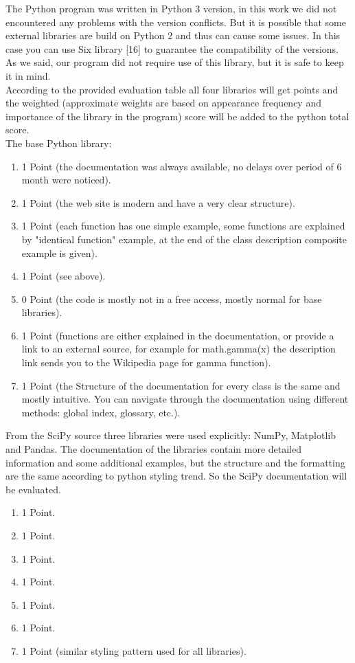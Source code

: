 \documentclass{article}
\begin{document}
The Python program was written in Python 3 version, in this work we did not encountered any problems with the version conflicts. But it is possible that some external libraries are build on Python 2 and thus can cause some issues. In this case you can use Six library [16] to guarantee the compatibility of the versions. As we said, our program did not require use of this library, but it is safe to keep it in mind.\\
According to the provided evaluation table all four libraries will get points and the weighted (approximate weights are based on appearance frequency and importance of the library in the program) score will be added to the python total score.\\
The base Python library:
\begin{enumerate}
    \item 1 Point (the documentation was always available, no delays over period of 6 month were noticed).
    \item 1 Point (the web site is modern and have a very clear structure).
    \item 1 Point (each function has one simple example, some functions are explained by "identical function" example, at the end of the class description composite example is given).
    \item 1 Point (see above).
    \item 0 Point (the code is mostly not in a free access, mostly normal for base libraries).
    \item 1 Point (functions are either explained in the documentation, or provide a link to an external source, for example for math.gamma(x) the description link sends you to the Wikipedia page for gamma function).
    \item 1 Point (the Structure of the documentation for every class is the same and  mostly intuitive. You can navigate through the documentation using different methods: global index, glossary, etc.).
\end{enumerate}
From the SciPy source three libraries were used explicitly: NumPy, Matplotlib and Pandas. The documentation of the libraries contain more detailed information and some additional examples, but the structure and the formatting are the same according to python styling trend. So the SciPy documentation will be evaluated.
\begin{enumerate}
    \item 1 Point.
    \item 1 Point.
    \item 1 Point.
    \item 1 Point.
    \item 1 Point.
    \item 1 Point.
    \item 1 Point (similar styling pattern used for all libraries).
\end{enumerate}
\end{document}
